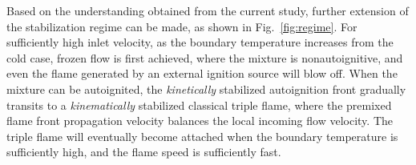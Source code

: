 \documentclass[twocolumn,10pt]{hphrc}
\begin{document}
Based on the understanding obtained from the current study, further extension of the stabilization regime can be made, as shown in Fig.~\ref{fig:regime}.  For sufficiently high inlet velocity, as the boundary temperature increases from the cold case, frozen flow is first achieved, where the mixture is nonautoignitive, and even the flame generated by an external ignition source will blow off.  When the mixture can be autoignited, the \emph {kinetically} stabilized autoignition front gradually transits to a \emph {kinematically} stabilized classical triple flame, where the premixed flame front propagation velocity balances the local incoming flow velocity.  The triple flame will eventually become attached when the boundary temperature is sufficiently high, and the flame speed is sufficiently fast.





%
%
%
%
%

\end{document}
